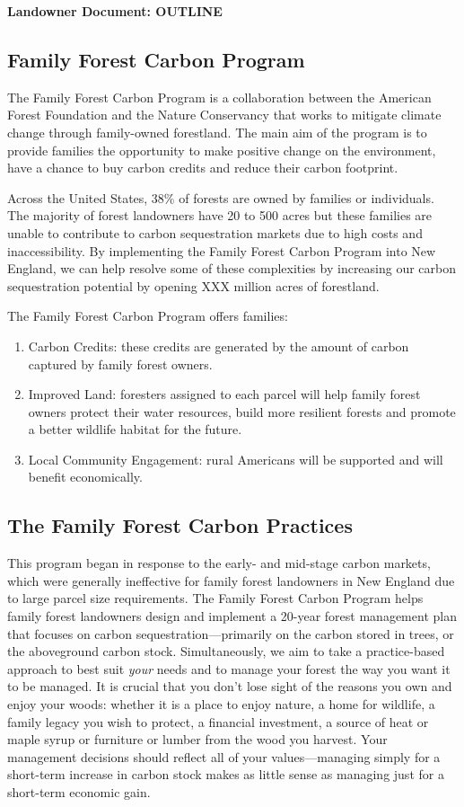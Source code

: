 \documentclass{article}\usepackage[]{graphicx}\usepackage[]{color}
\begin{document}
\noindent \textbf{\Large{Landowner Document: OUTLINE}}

\subsection*{Family Forest Carbon Program}

The Family Forest Carbon Program is a collaboration between the American Forest Foundation and the Nature Conservancy that works to mitigate climate change through family-owned forestland. The main aim of the program is to provide families the opportunity to make positive change on the environment, have a chance to buy carbon credits and reduce their carbon footprint. 

Across the United States, 38\% of forests are owned by families or individuals. The majority of forest landowners have 20 to 500 acres but these families are unable to contribute to carbon sequestration markets due to high costs and inaccessibility.  By implementing the Family Forest Carbon Program into New England, we can help resolve some of these complexities by increasing our carbon sequestration potential by opening XXX million acres of forestland. 

The Family Forest Carbon Program offers families: 
\begin{enumerate}
\item Carbon Credits: these credits are generated by the amount of carbon captured by family forest owners.
\item Improved Land: foresters assigned to each parcel will help family forest owners protect their water resources, build more resilient forests and promote a better wildlife habitat for the future.
\item Local Community Engagement: rural Americans will be supported and will benefit economically.
\end{enumerate}

\subsection*{The Family Forest Carbon Practices}
This program began in response to the early- and mid-stage carbon markets, which were generally ineffective for family forest landowners in New England due to large parcel size requirements. The Family Forest Carbon Program helps family forest landowners design and implement a 20-year forest management plan that focuses on carbon sequestration---primarily on the carbon stored in trees, or the aboveground carbon stock. Simultaneously, we aim to take a practice-based approach to best suit \textit{your} needs and to manage your forest the way you want it to be managed. It is crucial that you don't lose sight of the reasons you own and enjoy your woods: whether it is a place to enjoy nature, a home for wildlife, a family legacy you wish to protect, a financial investment, a source of heat or maple syrup or furniture or lumber from the wood you harvest. Your management decisions should reflect all of your values---managing simply for a short-term increase in carbon stock makes as little sense as managing just for a short-term economic gain.
\end{document}

